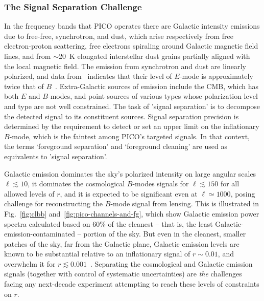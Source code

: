 \documentclass[PICOReport.tex]{subfiles}
\begin{document}

\subsubsection{The Signal Separation Challenge}
\label{sec:separation_challenge}

In the frequency bands that PICO operates there are Galactic intensity emissions due to free-free, synchrotron, and dust, which arise respectively from free electron-proton scattering, free electrons spiraling around Galactic magnetic field lines, and from $\sim$20~K elongated interstellar dust grains partially aligned with the local magnetic field. The emission from synchrotron and dust are linearly polarized, and data from \planck\ indicates that their level of $E$-mode is approximately twice that of $B$~\cite{planckEB}. Extra-Galactic sources of emission include the CMB, which has both $E$ and $B$-modes, and point sources of various types whose polarization level and type are not well constrained. The task of 'signal separation' is to decompose the detected signal to its constituent sources. Signal separation precision is determined by the requirement to detect or set an upper limit on the inflationary $B$-mode, which is the faintest among PICO's targeted signals. In that context, the terms `foreground separation' and `foreground cleaning' are used as equivalents to 'signal separation'. 

Galactic emission dominates the sky's polarized intensity on large angular scales $\ell \lesssim 10$, it dominates the cosmological $B$-modes signals for $\ell \lesssim 150$ for all allowed levels of $r$, and it is expected to be significant even at $\ell \simeq 1000$, posing challenge for reconstructing the $B$-mode signal from lensing. This is illustrated in Fig.~\ref{fig:clbb} and~\ref{fig:pico-channels-and-fg}, which show Galactic emission power spectra calculated based on 60\% of the cleanest -- that is, the least Galactic-emission-contaminated -- portion of the sky. But even in the cleanest, smaller patches of the sky, far from the Galactic plane, Galactic emission levels are known to be substantial relative to an inflationary signal of $r \sim 0.01$, and overwhelm it for $r \lesssim0.001$~\cite{planckB}. Separating the cosmological and Galactic emission signals (together with control of systematic uncertainties) are {\it the} challenges facing any next-decade experiment attempting to reach these levels of constraints on $r$.
\end{document}

